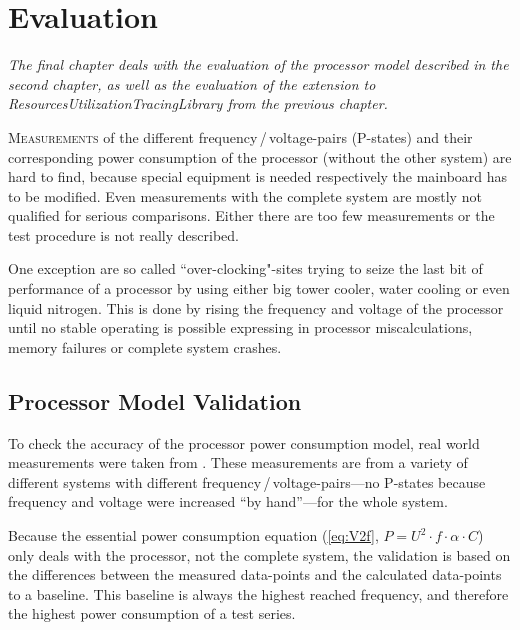 \renewcommand*{\dictumwidth}{0.5\textwidth}

\chapter{Evaluation}
\label{chap:evaluation}
\bigskip
\textit{The final chapter deals with the evaluation of the processor model described in the second chapter,  as well as the evaluation of the extension to ResourcesUtilizationTracingLibrary from the previous chapter.}

\bigskip
\lettrine[lines=2, lhang=.1, lraise=.1]{M}{easurements} of the different frequency\,/\,voltage-pairs (P-states) and their corresponding power consumption of the processor (without the other system) are hard to find, because special equipment is needed respectively the mainboard has to be modified\cite{ht4uCPU}. Even measurements with the complete system are mostly not qualified for serious comparisons. Either there are too few measurements or the test procedure is not really described.

One exception are so called ``over-clocking"-sites trying to seize the last bit of performance of a processor by using either big tower cooler, water cooling or even liquid nitrogen. This is done by rising the frequency and voltage of the processor until no stable operating is possible expressing in processor miscalculations, memory failures or complete system crashes.

\section{Processor Model Validation}
\label{sec:pmv}
To check the accuracy of the processor power consumption model, real world measurements were taken from \cite{xbit}. These measurements are from a variety of different systems with different frequency\,/\,voltage-pairs---no P-states because frequency and voltage were increased ``by hand''---for the whole system.

Because the essential power consumption equation (\ref{eq:V2f}, $P = U^2 \cdot f \cdot \alpha \cdot C$) only deals with the processor, not the complete system, the validation is based on the differences between the measured data-points and the calculated data-points to a baseline. This baseline is always the highest reached frequency, and therefore the highest power consumption of a test series.


